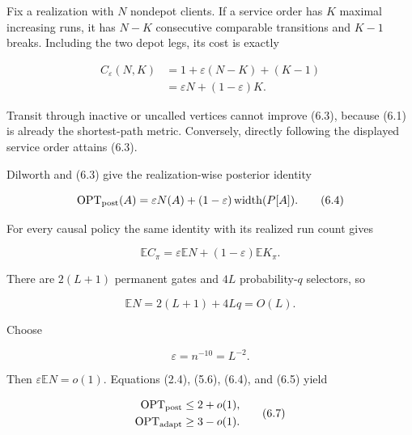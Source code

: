 \documentclass[11pt,a4paper]{article}
\begin{document}
Fix a realization with \(N\) nondepot clients.  If a service order has \(K\) maximal increasing runs, it has \(N-K\) consecutive comparable transitions and \(K-1\) breaks.  Including the two depot legs, its cost is exactly


\begin{equation}
\begin{aligned}
 C_\varepsilon(N,K)
 &=1+\varepsilon(N-K)+(K-1)\\
 &=\varepsilon N+(1-\varepsilon)K.
\end{aligned}
\tag{6.3}
\end{equation}

Transit through inactive or uncalled vertices cannot improve (6.3), because (6.1) is already the shortest-path metric.  Conversely, directly following the displayed service order attains (6.3).


Dilworth and (6.3) give the realization-wise posterior identity


\begin{equation}
 \operatorname{OPT}_{\rm post}(A)
   =\varepsilon N(A)
       +(1-\varepsilon)\operatorname{width}(P[A]).
\tag{6.4}
\end{equation}

For every causal policy the same identity with its realized run count gives


\begin{equation}
 \mathbb E C_\pi
   =\varepsilon\mathbb EN
       +(1-\varepsilon)\mathbb E K_\pi.
\tag{6.5}
\end{equation}

There are \(2(L+1)\) permanent gates and \(4L\) probability-\(q\) selectors, so


\[
                         \mathbb EN=2(L+1)+4Lq=O(L).
\]

Choose


\begin{equation}
                         \varepsilon=n^{-10}=L^{-2}.
\tag{6.6}
\end{equation}

Then \(\varepsilon\mathbb EN=o(1)\).  Equations (2.4), (5.6), (6.4), and (6.5) yield


\begin{equation}
\begin{aligned}
 \operatorname{OPT}_{\rm post}
   &\le2+o(1),\\
 \operatorname{OPT}_{\rm adapt}
   &\ge3-o(1).
\end{aligned}
\tag{6.7}
\end{equation}
\end{document}
